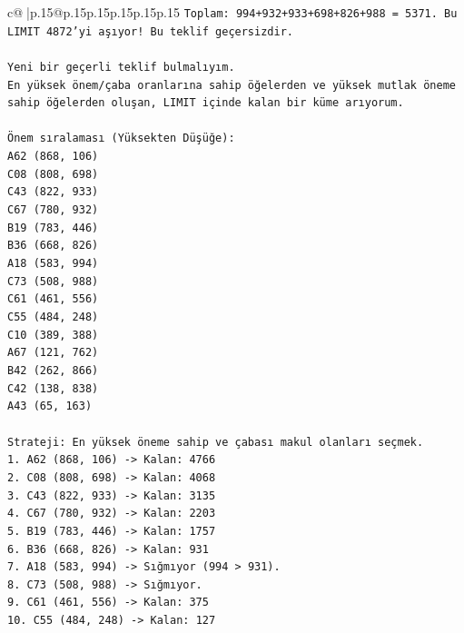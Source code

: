 \documentclass{article}
\begin{document}
{\begin{supertabular}{c@{$\;$}|p{.15\linewidth}@{}p{.15\linewidth}p{.15\linewidth}p{.15\linewidth}p{.15\linewidth}p{.15\linewidth}}
{{{\texttt{Toplam: 994+932+933+698+826+988 = 5371. Bu LIMIT 4872'yi aşıyor! Bu teklif geçersizdir.} \\
\\ 
\texttt{Yeni bir geçerli teklif bulmalıyım.} \\
\texttt{En yüksek önem/çaba oranlarına sahip öğelerden ve yüksek mutlak öneme sahip öğelerden oluşan, LIMIT içinde kalan bir küme arıyorum.} \\
\\ 
\texttt{Önem sıralaması (Yüksekten Düşüğe):} \\
\texttt{A62 (868, 106)} \\
\texttt{C08 (808, 698)} \\
\texttt{C43 (822, 933)} \\
\texttt{C67 (780, 932)} \\
\texttt{B19 (783, 446)} \\
\texttt{B36 (668, 826)} \\
\texttt{A18 (583, 994)} \\
\texttt{C73 (508, 988)} \\
\texttt{C61 (461, 556)} \\
\texttt{C55 (484, 248)} \\
\texttt{C10 (389, 388)} \\
\texttt{A67 (121, 762)} \\
\texttt{B42 (262, 866)} \\
\texttt{C42 (138, 838)} \\
\texttt{A43 (65, 163)} \\
\\ 
\texttt{Strateji: En yüksek öneme sahip ve çabası makul olanları seçmek.} \\
\texttt{1. A62 (868, 106) {-}> Kalan: 4766} \\
\texttt{2. C08 (808, 698) {-}> Kalan: 4068} \\
\texttt{3. C43 (822, 933) {-}> Kalan: 3135} \\
\texttt{4. C67 (780, 932) {-}> Kalan: 2203} \\
\texttt{5. B19 (783, 446) {-}> Kalan: 1757} \\
\texttt{6. B36 (668, 826) {-}> Kalan: 931} \\
\texttt{7. A18 (583, 994) {-}> Sığmıyor (994 > 931).} \\
\texttt{8. C73 (508, 988) {-}> Sığmıyor.} \\
\texttt{9. C61 (461, 556) {-}> Kalan: 375} \\
\texttt{10. C55 (484, 248) {-}> Kalan: 127} \\
}}}
\end{supertabular}}
\end{document}
